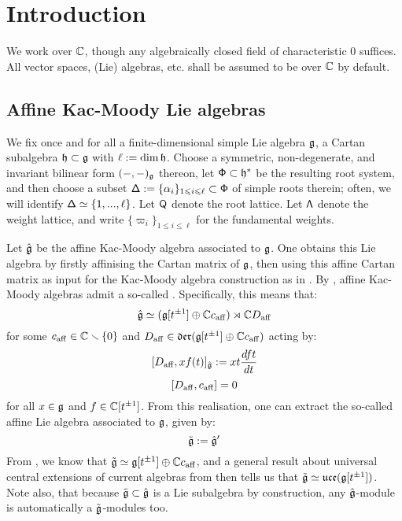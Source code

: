 \section{Introduction}
    \begin{convention}
        We work over $\mathbb{C}$, though any algebraically closed field of characteristic $0$ suffices. All vector spaces, (Lie) algebras, etc. shall be assumed to be over $\mathbb{C}$ by default.
    \end{convention}

    \subsection{Affine Kac-Moody Lie algebras}
        We fix once and for all a finite-dimensional simple Lie algebra $\mathfrak{g}$, a Cartan subalgebra $\mathfrak{h} \subset \mathfrak{g}$ with $\ell := \dim \mathfrak{h}$. Choose a symmetric, non-degenerate, and invariant bilinear form $(-, -)_{\mathfrak{g}}$ thereon, let $\mathsf{\Phi} \subset \mathfrak{h}^*$ be the resulting root system, and then choose a subset $\mathsf{\Delta} := \{\alpha_i\}_{1 \leqslant i \leqslant \ell} \subset \mathsf{\Phi}$ of simple roots therein; often, we will identify $\mathsf{\Delta} \simeq \{1, ..., \ell\}$. Let $\mathsf{Q}$ denote the root lattice. Let $\mathsf{\Lambda}$ denote the weight lattice, and write $\{\varpi_i\}_{1 \leq i \leq \ell}$ for the fundamental weights.

        Let $\hat{\mathfrak{g}}$ be the affine Kac-Moody algebra associated to $\mathfrak{g}$. One obtains this Lie algebra by firstly affinising the Cartan matrix of $\mathfrak{g}$, then using this affine Cartan matrix as input for the Kac-Moody algebra construction as in \cite[Chapter 1]{kac_infinite_dimensional_lie_algebras}. By \cite[Chapter 7]{kac_infinite_dimensional_lie_algebras}, affine Kac-Moody algebras admit a so-called . Specifically, this means that:
            $$\hat{\mathfrak{g}} \simeq (\mathfrak{g}[t^{\pm 1}] \oplus \mathbb{C} c_{\mathrm{aff}}) \rtimes \mathbb{C} D_{\mathrm{aff}}$$
        for some $c_{\mathrm{aff}} \in \mathbb{C} \smallsetminus \{0\}$ and $D_{\mathrm{aff}} \in \mathfrak{der}( \mathfrak{g}[t^{\pm 1}] \oplus \mathbb{C} c_{\mathrm{aff}} )$ acting by:
            $$[D_{\mathrm{aff}}, x f(t)]_{\hat{\mathfrak{g}}} := x t \frac{d ft}{dt}$$
            $$[D_{\mathrm{aff}}, c_{\mathrm{aff}}] = 0$$
        for all $x \in \mathfrak{g}$ and $f \in \mathbb{C}[t^{\pm 1}]$. From this realisation, one can extract the so-called affine Lie algebra associated to $\mathfrak{g}$, given by:
            $$\tilde{\mathfrak{g}} := \hat{\mathfrak{g}}'$$
        From \cite[Chapter 7]{kac_infinite_dimensional_lie_algebras}, we know that $\tilde{\mathfrak{g}} \simeq \mathfrak{g}[t^{\pm 1}] \oplus \mathbb{C} c_{\mathrm{aff}}$, and a general result about universal central extensions of current algebras from \cite{kassel_universal_central_extensions_of_lie_algebras} then tells us that $\tilde{\mathfrak{g}} \simeq \mathfrak{uce}(\mathfrak{g}[t^{\pm 1}])$. Note also, that because $\tilde{\mathfrak{g}} \subset \hat{\mathfrak{g}}$ is a Lie subalgebra by construction, any $\hat{\mathfrak{g}}$-module is automatically a $\tilde{\mathfrak{g}}$-modules too.

